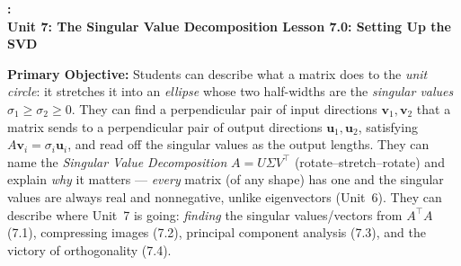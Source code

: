 \documentclass[10pt]{article}
\newcommand{\uu}{\mathbf{u}}
\newcommand{\vv}{\mathbf{v}}
\newcommand{\T}{^{\top}}
\newcommand{\UnitNumberName}{Unit 7: The Singular Value Decomposition \quad}
\newcommand{\LessonNumberName}{Lesson 7.0: Setting Up the SVD}
\begin{document}
\begin{center}
    {\Large\bfseries \CourseName: \SchoolYear \\
    {\small\bfseries \UnitNumberName \LessonNumberName}}
\end{center}

\begin{tcolorbox}[colback=blush, colframe=burgundy, boxrule=0.9pt, arc=2mm,
    left=2mm, right=2mm, top=1.5mm, bottom=1.5mm]
    \textbf{Primary Objective:} Students can describe what a matrix does to the \emph{unit circle}:
    it stretches it into an \emph{ellipse} whose two half-widths are the \emph{singular values}
    $\sigma_1\ge\sigma_2\ge0$. They can find a perpendicular pair of input directions $\vv_1,\vv_2$
    that a matrix sends to a perpendicular pair of output directions $\uu_1,\uu_2$, satisfying
    $A\vv_i=\sigma_i\uu_i$, and read off the singular values as the output lengths. They can name the
    \emph{Singular Value Decomposition} $A=U\Sigma V\T$ (rotate--stretch--rotate) and explain \emph{why}
    it matters --- \emph{every} matrix (of any shape) has one and the singular values are always real and
    nonnegative, unlike eigenvectors (Unit~6). They can describe where Unit~7 is going: \emph{finding}
    the singular values/vectors from $A\T A$ (7.1), compressing images (7.2), principal component analysis
    (7.3), and the victory of orthogonality (7.4).
\end{tcolorbox}
\end{document}
